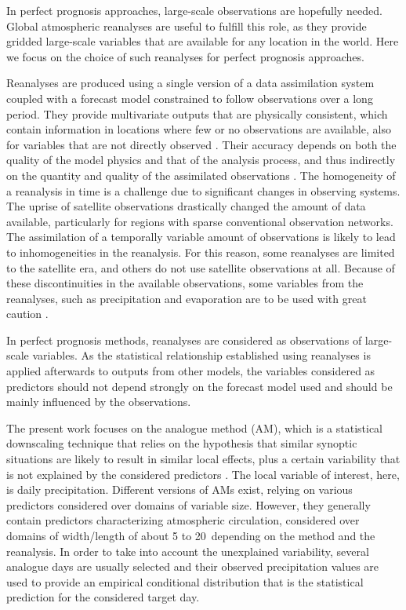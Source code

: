 \documentclass[smallextended]{svjour3}       %
\begin{document}
	In perfect prognosis approaches, large-scale observations are hopefully needed. Global atmospheric reanalyses are useful to fulfill this role, as they provide gridded large-scale variables that are available for any location in the world. Here we focus on the choice of such reanalyses for perfect prognosis approaches. 
	
	Reanalyses are produced using a single version of a data assimilation system coupled with a forecast model constrained to follow observations over a long period. They provide multivariate outputs that are physically consistent, which contain information in locations where few or no observations are available, also for variables that are not directly observed \citep{Gelaro2017}. Their accuracy depends on both the quality of the model physics and that of the analysis process, and thus indirectly on the quantity and quality of the assimilated observations \citep{Dee2011a}. The homogeneity of a reanalysis in time is a challenge due to significant changes in observing systems. The uprise of satellite observations drastically changed the amount of data available, particularly for regions with sparse conventional observation networks. The assimilation of a temporally variable amount of observations is likely to lead to inhomogeneities in the reanalysis. For this reason, some reanalyses are limited to the satellite era, and others do not use satellite observations at all. Because of these discontinuities in the available observations, some variables from the reanalyses, such as precipitation and evaporation are to be used with great caution \citep{Kobayashi2015}.
	
	In perfect prognosis methods, reanalyses are considered as observations of large-scale variables. As the statistical relationship established using reanalyses is applied afterwards to outputs from other models, the variables considered as predictors should not depend strongly on the forecast model used and should be mainly influenced by the observations.
	
	The present work focuses on the analogue method (AM), which is a statistical downscaling technique that relies on the hypothesis that similar synoptic situations are likely to result in similar local effects, plus a certain variability that is not explained by the considered predictors \citep{Lorenz1969}. The local variable of interest, here, is daily precipitation.  Different versions of AMs exist, relying on various predictors considered over domains of variable size. However, they generally contain predictors characterizing atmospheric circulation, considered over domains of width/length of about 5 to 20\degree\ depending on the method and the reanalysis. In order to take into account the unexplained variability, several analogue days are usually selected and their observed precipitation values are used to provide an empirical conditional distribution that is the statistical prediction for the considered target day.
	
\end{document}
